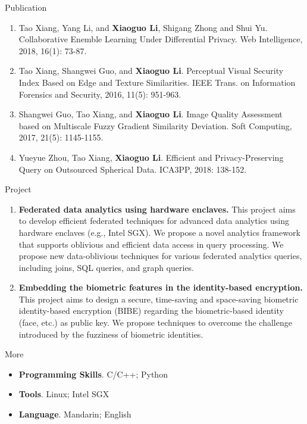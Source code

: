 \documentclass[]{mcdowellcv}
\newcommand{\graycolor}{\textcolor[rgb]{0.3,0.3,0.3}}
\begin{document}
\begin{cvsection}{\Large Publication}
\begin{cvsubsection}{}{}{}
{\begin{enumerate}
				\item Tao Xiang, Yang Li, and \textbf{Xiaoguo Li}, Shigang Zhong and Shui Yu. Collaborative Enemble Learning Under Differential Privacy. Web Intelligence, 2018, 16(1): 73-87.
				\item Tao Xiang, Shangwei Guo, and \textbf{Xiaoguo Li}. Perceptual Visual Security Index Based on Edge and Texture Similarities. IEEE Trans. on Information Forensics and Security, 2016, 11(5): 951-963.
				\item Shangwei Guo, Tao Xiang, and \textbf{Xiaoguo Li}. Image Quality Assessment based on Multiscale Fuzzy Gradient Similarity Deviation. Soft Computing, 2017, 21(5): 1145-1155.
				\item Yueyue Zhou, Tao Xiang, \textbf{Xiaoguo Li}. Efficient and Privacy-Preserving Query on Outsourced Spherical Data. ICA3PP, 2018: 138-152.
			\end{enumerate}}
		\end{cvsubsection}
	\end{cvsection}

	\begin{cvsection}{\Large Project}
	\begin{cvsubsection}{}{}{}\graycolor{
			\begin{enumerate}
				\item \textbf{Federated data analytics using hardware enclaves.} This project aims to develop efficient federated techniques for advanced data analytics using
				hardware enclaves (e.g., Intel SGX). We propose a novel analytics framework that
				supports oblivious and efficient data access in query processing. We propose new data-oblivious techniques for various federated analytics queries, including joins, SQL queries, and graph queries.
				\item \textbf{Embedding the biometric features in the identity-based encryption.} This project aims to design a secure, time-saving and space-saving biometric identity-based encryption (BIBE) regarding the	biometric-based identity (face, etc.) as public key. We propose techniques to overcome the challenge introduced by the fuzziness of biometric identities.
			\end{enumerate}}
	\end{cvsubsection}
	\end{cvsection}
	
	\begin{cvsection}{\Large More}
		\begin{cvsubsection}{}{}{}
			\begin{itemize}
				\item \textbf{Programming Skills}. \graycolor{C/C++; Python}
				\item \textbf{Tools}. \graycolor{Linux; Intel SGX}
				\item \textbf{Language}. \graycolor{Mandarin; English}
			\end{itemize}
		\end{cvsubsection}
	\end{cvsection}
	
\end{document}
